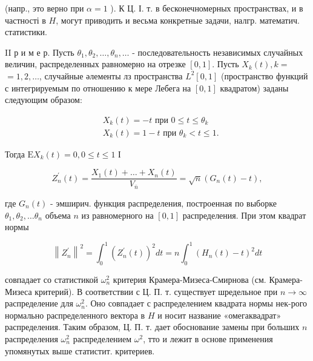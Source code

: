 \documentclass[10pt]{article}
\begin{document}
(напр., это верно при $\alpha=1$ ). К Ц. І. т. в бесконечномерных пространствах, и в частності в $H$, могут приводить и весьма конкретные задачи, налгр. математич. статистики.



II р и м е р. Пусть $\theta_{1}, \theta_{2}, \ldots, \theta_{n}, \ldots$ - последовательность независимых случайных величин, распределенных равномерно на отрезке $[0,1]$. Пусть $X_{k}(t), k=$ $=1,2, \ldots$, случайные әлементы лз пространства $L^{2}[0,1]$ (пространство функций с интегрируемым по отношению к мере Лебега на $[0,1]$ квадратом) заданы следующим образом:



\[

\begin{aligned}

& X_{k}(t)=-t \text { при } 0 \leqslant t \leqslant \theta_{k} \\

& X_{k}(t)=1-t \text { при } \theta_{k}<t \leqslant 1 .

\end{aligned}

\]



Тогда $\mathrm{E} X_{k}(t)=0,0 \leqslant t \leqslant 1$ І



\[

Z_{n}^{\prime}(t)=\frac{X_{1}(t)+\ldots+X_{n}(t)}{V_{\bar{n}}}=\sqrt{n}\left(G_{n}(t)-t\right),

\]



где $G_{n}(t)$ - эмширич. функция распределения, построенная по выборке $\theta_{1}, \theta_{2}, \ldots \theta_{n}$ объема $n$ из равномерного на $[0,1]$ распределения. При этом квадрат нормы



\[

\left\|Z_{n}^{\prime}\right\|^{2}=\int_{0}^{1}\left(Z_{n}^{\prime}(t)\right)^{2} d t=n \int_{0}^{1}\left(H_{n}(t)-t\right)^{2} d t

\]



совпадает со статистикой $\omega_{n}^{2}$ критерия Крамера-Мизеса-Смирнова (см. Крамера-Мизеса критерий). В соответствии с Ц. П. т. существует шредельное при $n \longrightarrow \infty$ распределение для $\omega_{n}^{2}$. Оно совпадает с распределением квадрата нормы нек-рого нормально распределенного вектора в $H$ и носит название «омегаквадрат» распределения. Таким образом, Ц. П. т. дает обоснование замены при больших $n$ распределения $\omega_{n}^{2}$ распределением $\omega^{2}$, тто и лежит в основе применения упомянутых выше статистит. критериев.
\end{document}

